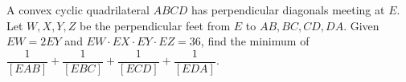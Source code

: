 A convex cyclic quadrilateral $ABCD$ has perpendicular diagonals meeting at $E$. Let $W,X,Y,Z$ be the perpendicular feet from $E$ to $AB,BC,CD,DA$. Given $EW=2EY$ and $EW\cdot EX\cdot EY\cdot EZ=36$, find the minimum of $\dfrac{1}{[EAB]}+\dfrac{1}{[EBC]}+\dfrac{1}{[ECD]}+\dfrac{1}{[EDA]}$.
